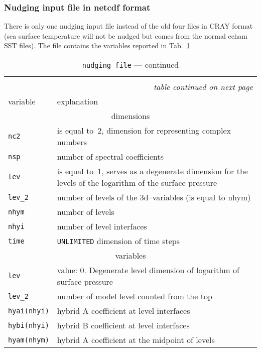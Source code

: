 \begin{appendix}
\subsubsection{Nudging input file in netcdf format}

There is only one nudging input file instead of the old four files in
CRAY format (sea surface
temperature will not be nudged but comes from the normal echam SST
files). The file contains the variables reported in
Tab.~\ref{tabndgvar}

\setlength{\LTcapwidth}{\textwidth}
\setlength{\LTleft}{0pt}\setlength{\LTright}{0pt}

\begin{longtable}{l@{\extracolsep\fill}p{10.0cm}}
\hline\hline\caption[Content of nudging file]{Content of 
  nudging file}\\\hline\label{tabndgvar}
\endfirsthead
\caption[]{{\tt nudging file} --- continued}\\\hline
\endhead
\hline\multicolumn{2}{r}{\slshape table continued on next page}\\
\endfoot
\hline %
\endlastfoot
variable & explanation \\\hline
\multicolumn{2}{c}{dimensions}\\\hline
{\tt nc2} & is equal to~2, dimension for representing complex numbers \\
{\tt nsp} & number of spectral coefficients \\
{\tt lev} & is equal to~1, serves as a degenerate dimension for the
levels of the logarithm of the surface pressure \\
{\tt lev\_2} & number of levels of the 3d--variables (is equal to nhym)\\
{\tt nhym} & number of levels\\
{\tt nhyi} & number of level interfaces\\
{\tt time} & {\tt UNLIMITED} dimension of time steps\\\hline
\multicolumn{2}{c}{variables}\\\hline
{\tt lev} & value: 0. Degenerate level dimension of logarithm of
surface pressure \\
{\tt lev\_2} & number of model level counted from the top \\
{\tt hyai(nhyi)} & hybrid A coefficient at level interfaces \\
{\tt hybi(nhyi)} & hybrid B coefficient at level interfaces \\
{\tt hyam(nhym)} & hybrid A coefficient at the midpoint of levels \\

\end{longtable}
\end{appendix}
